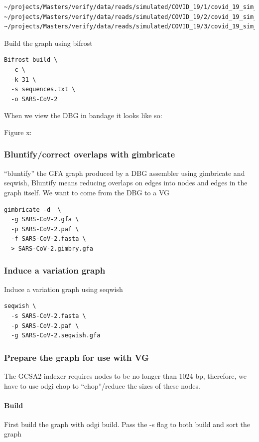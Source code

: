 \documentclass[10pt, a4paper]{article}
\begin{document}
\begin{verbatim}
~/projects/Masters/verify/data/reads/simulated/COVID_19/1/covid_19_sim_1_interleaved.fastq
~/projects/Masters/verify/data/reads/simulated/COVID_19/2/covid_19_sim_2_interleaved.fastq
~/projects/Masters/verify/data/reads/simulated/COVID_19/3/covid_19_sim_3_interleaved.fastq
\end{verbatim}

Build the graph using bifrost

\begin{verbatim}
Bifrost build \
  -c \
  -k 31 \
  -s sequences.txt \
  -o SARS-CoV-2
\end{verbatim}

When we view the DBG in bandage it looks like so:

Figure x:
\subsubsection{Bluntify/correct overlaps with gimbricate}
\label{sec:org8736e9b}
“bluntify” the GFA graph produced by a DBG assembler using gimbricate and seqwish, Bluntify means reducing overlaps on edges into nodes and edges in the graph itself.
We want to come from the DBG to a VG

\begin{verbatim}
gimbricate -d  \
  -g SARS-CoV-2.gfa \
  -p SARS-CoV-2.paf \
  -f SARS-CoV-2.fasta \
  > SARS-CoV-2.gimbry.gfa
\end{verbatim}

\subsubsection{Induce a variation graph}
\label{sec:org60ba8e1}
Induce a variation graph using seqwish

\begin{verbatim}
seqwish \
  -s SARS-CoV-2.fasta \
  -p SARS-CoV-2.paf \
  -g SARS-CoV-2.seqwish.gfa
\end{verbatim}

\subsubsection{Prepare the graph for use with VG}
\label{sec:orgc567a83}
The GCSA2 indexer requires nodes to be no longer than 1024 bp, therefore, we have to use odgi chop to “chop”/reduce the sizes of these nodes.
\paragraph{Build}
\label{sec:org1a1f05b}
First build the graph with odgi build. Pass the -s flag to both build and sort the graph
\end{document}
